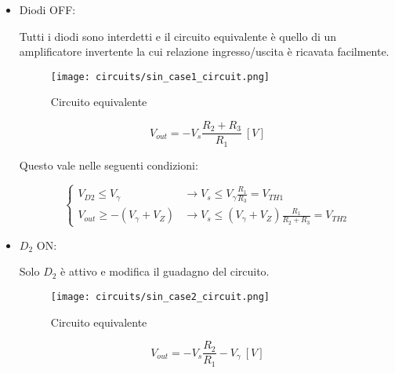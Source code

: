 \begin{itemize}
    \item Diodi OFF:

          Tutti i diodi sono interdetti e il circuito equivalente è quello di un amplificatore invertente
          la cui relazione ingresso/uscita è ricavata facilmente.

          \begin{minipage}{0.45\textwidth}
              \centering
              \begin{figure}[H]
                  \centering
                  \texttt{[image: circuits/sin\_case1\_circuit.png]}
                  \caption{Circuito equivalente}
                  \label{sin_case1_circuit}
              \end{figure}
          \end{minipage}
          \begin{minipage}{0.45\textwidth}
              \centering
              \begin{equation}
                  V_{out}=-V_s\frac{R_2+R_3}{R_1}\ [V]
              \end{equation}
          \end{minipage}

          Questo vale nelle seguenti condizioni:

          \begin{equation}
              \left\{
              \begin{array}{ll}
                  V_{D2}\leq V_{\gamma}        & \rightarrow V_s\leq V_{\gamma}\frac{R_1}{R_3}=V_{TH1}          \\
                  V_{out}\geq-(V_{\gamma}+V_Z) & \rightarrow V_s\leq(V_{\gamma}+V_Z)\frac{R_1}{R_2+R_3}=V_{TH2}
              \end{array}
              \right.
          \end{equation}

    \item $D_2$ ON:

          Solo $D_2$ è attivo e modifica il guadagno del circuito.

          \begin{minipage}{0.45\textwidth}
              \centering
              \begin{figure}[H]
                  \centering
                  \texttt{[image: circuits/sin\_case2\_circuit.png]}
                  \caption{Circuito equivalente}
                  \label{sin_case2_circuit}
              \end{figure}
          \end{minipage}
          \begin{minipage}{0.45\textwidth}
              \centering
              \begin{equation}
                  V_{out}=-V_s\frac{R_2}{R_1}-V_\gamma\ [V]
              \end{equation}
          \end{minipage}


\end{itemize}
